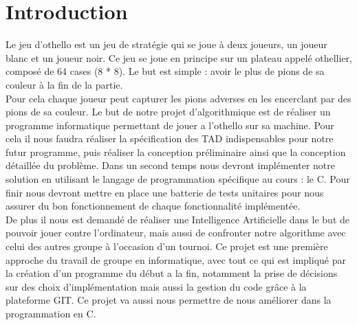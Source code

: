 \section{Introduction}
Le jeu d'othello est un jeu de stratégie qui se joue à deux joueurs, un joueur blanc et un joueur noir. 
Ce jeu se joue en principe sur un plateau appelé othellier, composé de 64 cases (8 * 8).
Le but est simple : avoir le plus de pions de sa couleur à la fin de la partie.\\
Pour cela chaque joueur peut capturer les pions adverses en les encerclant par des pions de sa couleur. 
 Le but de notre projet d'algorithmique est de réaliser un programme informatique permettant de jouer a l'othello sur sa machine.
Pour cela il nous faudra réaliser la spécification des TAD indispensables pour notre futur programme, puis réaliser la conception préliminaire ainsi que la conception détaillée du problème.
Dans un second temps nous devront implémenter notre solution en utilisant le langage de programmation spécifique au cours : le C. 
Pour finir nous devront mettre en place une batterie de tests unitaires pour nous assurer du bon fonctionnement de chaque fonctionnalité implémentée.\\
De plus il nous est demandé de réaliser une Intelligence Artificielle dans le but de pouvoir jouer contre l'ordinateur, mais aussi de confronter notre algorithme avec celui des autres groupe à l'occasion d'un tournoi.
Ce projet est une première approche du travail de groupe en informatique, avec tout ce qui est impliqué par la création d'un programme du début a la fin, notamment la prise de décisions sur des choix d'implémentation mais aussi la gestion du code grâce à la plateforme GIT.  
 Ce projet va  aussi nous permettre  de nous améliorer dans la programmation en C.
 

